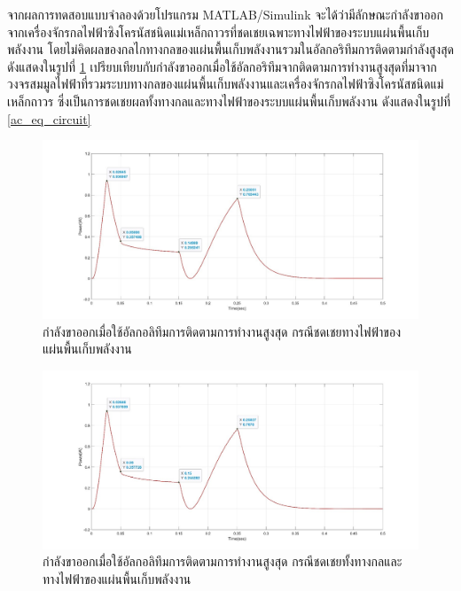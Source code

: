 \documentclass[11pt,a4paper]{article}
\begin{document}
จากผลการทดสอบแบบจำลองด้วยโปรแกรม MATLAB/Simulink จะได้ว่ามีลักษณะกำลังขาออกจากเครื่องจักรกลไฟฟ้าซิงโครนัสชนิดแม่เหล็กถาวรที่ชดเชยเฉพาะทางไฟฟ้าของระบบแผ่นพื้นเก็บพลังงาน โดยไม่คิดผลของกลไกทางกลของแผ่นพื้นเก็บพลังงานรวมในอัลกอริทึมการติดตามกำลังสูงสุด ดังแสดงในรูปที่ \ref{power_ac} 
เปรียบเทียบกับกำลังขาออกเมื่อใช้อัลกอริทึมจากติดตามการทำงานสูงสุดที่มาจากวงจรสมมูลไฟฟ้าที่รวมระบบทางกลของแผ่นพื้นเก็บพลังงานและเครื่องจักรกลไฟฟ้าซิงโครนัสชนิดแม่เหล็กถาวร ซึ่งเป็นการชดเชยผลทั้งทางกลและทางไฟฟ้าของระบบแผ่นพื้นเก็บพลังงาน ดังแสดงในรูปที่ \ref{ac_eq_circuit}
\begin{figure}[H]
    \begin{center}
        \includegraphics[width=1\textwidth]{power_ac.jpg}
    \end{center}
    \caption{กำลังขาออกเมื่อใช้อัลกอลิทึมการติดตามการทำงานสูงสุด กรณีชดเชยทางไฟฟ้าของแผ่นพื้นเก็บพลังงาน}
    \label{power_ac}
\end{figure}
\begin{figure}[H]
    \begin{center}
        \includegraphics[width=1\textwidth]{power_ac_Rm.jpg}
    \end{center}
    \caption{กำลังขาออกเมื่อใช้อัลกอลิทึมการติดตามการทำงานสูงสุด กรณีชดเชยทั้งทางกลและทางไฟฟ้าของแผ่นพื้นเก็บพลังงาน}
    \label{power_ac_Rm}
\end{figure}
\end{document}
